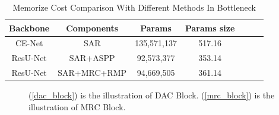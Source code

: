 \documentclass{ieeeaccess}
\begin{document}
\begin{table}[htbp]
  \vspace{-2mm}
  \begin{center}\small
  \label{param-table}
  \begin{tabular}{ccccccc}
    
  \toprule
  Backbone & Components & Params & Params size \\
  \midrule
    CE-Net & SAR & 135,571,137 & 517.16 \\
    ResU-Net & SAR+ASPP    & 92,573,377 & 353.14  \\
    ResU-Net & SAR+MRC+RMP & 94,669,505 & 361.14  \\
\bottomrule    
  \end{tabular}
  \caption{Memorize Cost Comparison With Different Methods In Bottleneck}
\end{center}
  \vspace{-4mm}
\end{table}

\begin{figure}[htbp]
    \xdef\xfigwd{\textwidth}%
    \centering
    \qquad
    \caption{(\ref{dac_block}) is the illustration of DAC Block. (\ref{mrc_block}) is the illustration of MRC Block.}
    
\end{figure}
\end{document}
